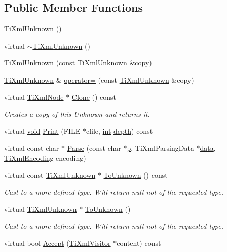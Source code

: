 \subsection*{Public Member Functions}
\begin{DoxyCompactItemize}
\item 
\hyperlink{class_ti_xml_unknown_a945f09b3c6538099c69fc563216750c3}{Ti\-Xml\-Unknown} ()
\item 
virtual \hyperlink{class_ti_xml_unknown_ac21966c3b551553d760b4a339c9acda0}{$\sim$\-Ti\-Xml\-Unknown} ()
\item 
\hyperlink{class_ti_xml_unknown_abe798ff4feea31474850c7f0de6bdf5e}{Ti\-Xml\-Unknown} (const \hyperlink{class_ti_xml_unknown}{Ti\-Xml\-Unknown} \&copy)
\item 
\hyperlink{class_ti_xml_unknown}{Ti\-Xml\-Unknown} \& \hyperlink{class_ti_xml_unknown_a60560b5aacb4bdc8b2b5f02f0a99c5c0}{operator=} (const \hyperlink{class_ti_xml_unknown}{Ti\-Xml\-Unknown} \&copy)
\item 
virtual \hyperlink{class_ti_xml_node}{Ti\-Xml\-Node} $\ast$ \hyperlink{class_ti_xml_unknown_a0960bb7428b3f341da46244229604d73}{Clone} () const 
\begin{DoxyCompactList}\small\item\em Creates a copy of this Unknown and returns it. \end{DoxyCompactList}\item 
virtual \hyperlink{wglew_8h_aeea6e3dfae3acf232096f57d2d57f084}{void} \hyperlink{class_ti_xml_unknown_a31ba089a40fb5a1869750fce09b0bacb}{Print} (F\-I\-L\-E $\ast$cfile, \hyperlink{wglew_8h_a500a82aecba06f4550f6849b8099ca21}{int} \hyperlink{glew_8h_a1c814629538debe12a7bfe2509a3671e}{depth}) const 
\item 
virtual const char $\ast$ \hyperlink{class_ti_xml_unknown_a0d0a0f8ec748f12bd1dc3ef6d64d7c87}{Parse} (const char $\ast$\hyperlink{glew_8h_aa5367c14d90f462230c2611b81b41d23}{p}, Ti\-Xml\-Parsing\-Data $\ast$\hyperlink{fmod__codec_8h_a42c2b1d86fa71a425e73a882cb0a72c8}{data}, \hyperlink{tinyxml_8h_a88d51847a13ee0f4b4d320d03d2c4d96}{Ti\-Xml\-Encoding} encoding)
\item 
virtual const \hyperlink{class_ti_xml_unknown}{Ti\-Xml\-Unknown} $\ast$ \hyperlink{class_ti_xml_unknown_ab0313e5fe77987d746ac1a97a254419d}{To\-Unknown} () const 
\begin{DoxyCompactList}\small\item\em Cast to a more defined type. Will return null not of the requested type. \end{DoxyCompactList}\item 
virtual \hyperlink{class_ti_xml_unknown}{Ti\-Xml\-Unknown} $\ast$ \hyperlink{class_ti_xml_unknown_a67c9fd22940e8c47f706a72cdd2e332c}{To\-Unknown} ()
\begin{DoxyCompactList}\small\item\em Cast to a more defined type. Will return null not of the requested type. \end{DoxyCompactList}\item 
virtual bool \hyperlink{class_ti_xml_unknown_ad7122e5135581b3c832a1a3217760a93}{Accept} (\hyperlink{class_ti_xml_visitor}{Ti\-Xml\-Visitor} $\ast$content) const 
\end{DoxyCompactItemize}

